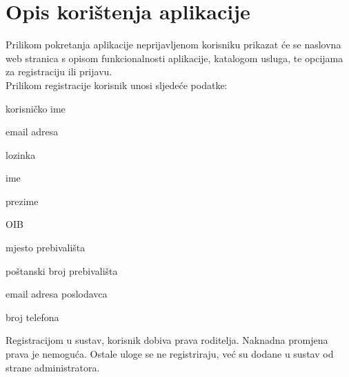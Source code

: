 		\section{Opis korištenja aplikacije}
		
		Prilikom pokretanja aplikacije neprijavljenom korisniku prikazat će se naslovna web stranica s opisom funkcionalnosti aplikacije, katalogom usluga, te opcijama za registraciju ili prijavu. \\
		Prilikom registracije korisnik unosi sljedeće podatke:
		\begin{packed_item}
			
			\item  korisničko ime
			\item  email adresa
			\item  lozinka
			\item  ime
			\item  prezime
			\item  OIB
			\item  mjesto prebivališta
			\item  poštanski broj prebivališta
			\item  email adresa poslodavca
			\item  broj telefona
			
		\end{packed_item}
		Registracijom u sustav, korisnik dobiva prava roditelja. Naknadna promjena prava je nemoguća. Ostale uloge se ne registriraju, već su dodane u sustav od strane administratora. 
		
